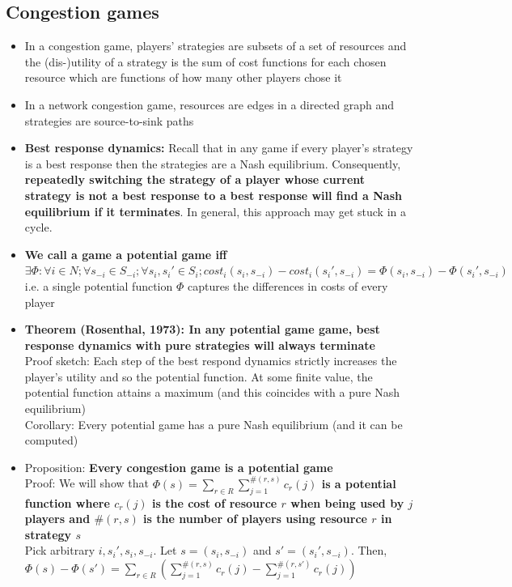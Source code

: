 \documentclass[20pt,a4paper,landscape]{extarticle}
\begin{document}
\begin{flushleft}
\subsection{Congestion games}
\begin{itemize}
\item In a congestion game, players' strategies are subsets of a set of resources and the (dis-)utility of a strategy is the sum of cost functions for each chosen resource which are functions of how many other players chose it
\item In a network congestion game, resources are edges in a directed graph and strategies are source-to-sink paths
\item \textbf{Best response dynamics:} Recall that in any game if every player's strategy is a best response then the strategies are a Nash equilibrium. Consequently, \textbf{repeatedly switching the strategy of a player whose current strategy is not a best response to a best response will find a Nash equilibrium if it terminates}. In general, this approach may get stuck in a cycle.
\item \textbf{We call a game a potential game iff \boldmath$\exists \Phi: \forall i \in N; \forall s_{-i} \in S_{-i}; \forall s_i, s_i' \in S_i; cost_i(s_i, s_{-i}) - cost_i(s_i', s_{-i}) = \Phi(s_i, s_{-i}) - \Phi(s_i', s_{-i})$} i.e. a single potential function $\Phi$ captures the differences in costs of every player
\item \textbf{Theorem (Rosenthal, 1973): In any potential game game, best response dynamics with pure strategies will always terminate}\\
Proof sketch: Each step of the best respond dynamics strictly increases the player's utility and so the potential function. At some finite value, the potential function attains a maximum (and this coincides with a pure Nash equilibrium)\\
Corollary: Every potential game has a pure Nash equilibrium (and it can be computed)
\clearpage
\item Proposition: \textbf{Every congestion game is a potential game}\\
Proof:
We will show that \textbf{\boldmath$\Phi(s) = \sum_{r \in R}\sum_{j = 1}^{\#(r, s)} c_r(j)$ is a potential function where $c_r(j)$ is the cost of resource $r$ when being used by $j$ players and $\#(r, s)$ is the number of players using resource $r$ in strategy $s$}\\
Pick arbitrary $i, s_i', s_i, s_{-i}$. Let $s = (s_i, s_{-i})$ and $s' = (s_i', s_{-i})$. Then, $\Phi(s) - \Phi(s') = \sum_{r \in R} \left(\sum_{j = 1}^{\#(r, s)} c_r(j) - \sum_{j = 1}^{\#(r, s')} c_r(j)\right)$\\

\end{itemize}
\end{flushleft}
\end{document}
